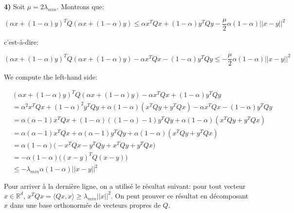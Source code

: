 \documentclass[
10pt, %
a4paper, %
oneside, %
headinclude,footinclude, %
BCOR5mm, %
]{scrartcl}
\begin{document}
\textbf{4)} Soit $\mu = 2\lambda_{min}$. Montrons que:

\begin{equation}
    (\alpha x+(1-\alpha)y)^TQ(\alpha x+(1-\alpha)y)\leq \alpha x^TQx+(1-\alpha)y^TQy- \frac{\mu}{2} \alpha(1-\alpha)||x-y||^2
\end{equation}

c'est-à-dire:

\begin{equation}
    (\alpha x+(1-\alpha)y)^TQ(\alpha x+(1-\alpha)y) -\alpha x^TQx-(1-\alpha)y^TQy\leq - \frac{\mu}{2} \alpha(1-\alpha)||x-y||^2
\end{equation}

We compute the left-hand side:

\begin{equation}
    \begin{aligned}
        \label{eq:}
	&(\alpha x+(1-\alpha)y)^TQ(\alpha x+(1-\alpha)y) -\alpha x^TQx+(1-\alpha)y^TQy \\
	&= \alpha^2 x^TQx + (1-\alpha)^2 y^TQy + \alpha(1-\alpha)(x^TQy+y^TQx)-\alpha x^TQx-(1-\alpha)y^TQy\\
	&= \alpha(\alpha-1) x^TQx + (1-\alpha)((1-\alpha)-1) y^TQy + \alpha(1-\alpha)(x^TQy+y^TQx)\\
	&= \alpha(\alpha-1) x^TQx + \alpha(\alpha-1) y^TQy + \alpha(1-\alpha)(x^TQy+y^TQx)\\
	&= \alpha(1-\alpha) \Big(-x^TQx -  y^TQy + x^TQy+y^TQx\Big)\\
	&= -\alpha(1-\alpha) \Big((x-y)^TQ(x-y)\Big)\\
	&\leq -\lambda_{min}\alpha(1-\alpha)||x-y||^2
    \end{aligned}
\end{equation}

Pour arriver à la dernière ligne, on a utilisé le résultat suivant: pour tout vecteur $x\in \mathbb{R}^d$, $x^TQx=\langle Qx, x\rangle\geq \lambda_{min} ||x||^2$. On peut prouver ce résultat en décomposant $x$ dans une base orthonormée de vecteurs propres de $Q$.
\end{document}

